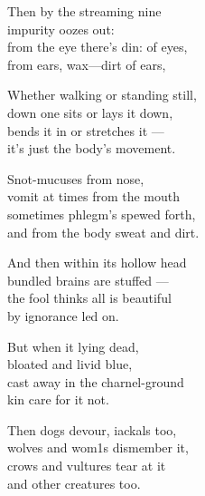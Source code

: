 \begin{MyDescription}{}
Then by the streaming nine\\
impurity oozes out:\\
from the eye there's din: of eyes,\\
from ears, wax—dirt of ears,
\end{MyDescription}

\begin{MyDescription}{}
Whether walking or standing still,\\
down one sits or lays it down,\\
bends it in or stretches it —\\
it's just the body's movement.
\end{MyDescription}

\begin{MyDescription}{}
Snot-mucuses from nose,\\
vomit at times from the mouth\\
sometimes phlegm's spewed forth,\\
and from the body sweat and dirt.
\end{MyDescription}

\begin{MyDescription}{}
And then within its hollow head\\
bundled brains are stuffed —\\
the fool thinks all is beautiful\\
by ignorance led on.
\end{MyDescription}

\begin{MyDescription}{}
But when it lying dead,\\
bloated and livid blue,\\
cast away in the charnel-ground\\
kin care for it not.
\end{MyDescription}

\begin{MyDescription}{}
Then dogs devour, iackals too,\\
wolves and wom1s dismember it,\\
crows and vultures tear at it\\
and other creatures too.
\end{MyDescription}

